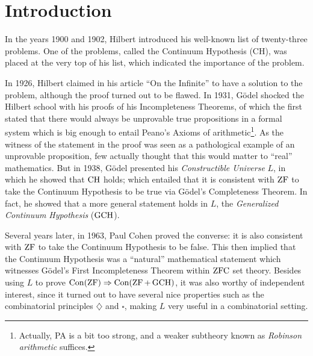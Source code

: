 \chapter{Introduction}
\thispagestyle{fancy}
\setlength{\parindent}{18pt}

\begin{onehalfspacing}

In the years 1900 and 1902, Hilbert introduced his well-known list of twenty-three problems. One of the problems, called the Continuum Hypothesis (CH), was placed at the very top of his list, which indicated the importance of the problem.


In 1926, Hilbert claimed in his article ``On the Infinite'' \cite{Hilbert} to have a solution to the problem, although the proof turned out to be flawed. In 1931, Gödel shocked the Hilbert school with his proofs of his Incompleteness Theorems, of which the first stated that there would always be unprovable true propositions in a formal system which is big enough to entail Peano's Axioms of arithmetic\footnote{Actually, PA is a bit too strong, and a weaker subtheory known as \textit{Robinson arithmetic} suffices.}. As the witness of the statement in the proof was seen as a pathological example of an unprovable proposition, few actually thought that this would matter to ``real'' mathematics. But in 1938, Gödel presented his \textit{Constructible Universe} $L$, in which he showed that $\operatorname{CH}$ holds; which entailed that it is consistent with $\operatorname{ZF}$ to take the Continuum Hypothesis to be true via Gödel's Completeness Theorem. In fact, he showed that a more general statement holds in $L$, the \textit{Generalized Continuum Hypothesis} ($\operatorname{GCH}$).


Several years later, in 1963, Paul Cohen proved the converse: it is also consistent with $\operatorname{ZF}$ to take the Continuum Hypothesis to be false. This then implied that the Continuum Hypothesis was a ``natural'' mathematical statement which witnesses Gödel's First Incompleteness Theorem within $\operatorname{ZFC}$ set theory. Besides using $L$ to prove $\operatorname{Con}(\operatorname{ZF})\Rightarrow\operatorname{Con}(\operatorname{ZF}+\operatorname{GCH})$, it was also worthy of independent interest, since it turned out to have several nice properties such as the combinatorial principles $\diamondsuit$ and $\square$, making $L$ very useful in a combinatorial setting.


\end{onehalfspacing}
